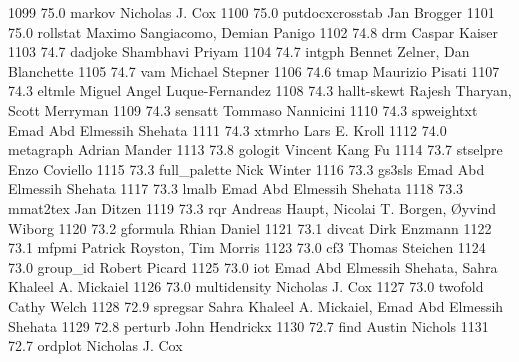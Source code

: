   1099     75.0    markov        Nicholas J. Cox                         
  1100     75.0    putdocxcrosstab  Jan Brogger                             
  1101     75.0    rollstat      Maximo Sangiacomo, Demian Panigo        
  1102     74.8    drm           Caspar Kaiser                           
  1103     74.7    dadjoke       Shambhavi Priyam                        
  1104     74.7    intgph        Bennet Zelner, Dan Blanchette           
  1105     74.7    vam           Michael Stepner                         
  1106     74.6    tmap          Maurizio Pisati                         
  1107     74.3    eltmle        Miguel Angel Luque-Fernandez            
  1108     74.3    hallt-skewt   Rajesh Tharyan, Scott Merryman          
  1109     74.3    sensatt       Tommaso Nannicini                       
  1110     74.3    spweightxt    Emad Abd Elmessih Shehata               
  1111     74.3    xtmrho        Lars E. Kroll                           
  1112     74.0    metagraph     Adrian Mander                           
  1113     73.8    gologit       Vincent Kang Fu                         
  1114     73.7    stselpre      Enzo Coviello                           
  1115     73.3    full_palette  Nick Winter                             
  1116     73.3    gs3sls        Emad Abd Elmessih Shehata               
  1117     73.3    lmalb         Emad Abd Elmessih Shehata               
  1118     73.3    mmat2tex      Jan Ditzen                              
  1119     73.3    rqr           Andreas Haupt, Nicolai T. Borgen,       
                                   Øyvind Wiborg                          
  1120     73.2    gformula      Rhian Daniel                            
  1121     73.1    divcat        Dirk Enzmann                            
  1122     73.1    mfpmi         Patrick Royston, Tim Morris             
  1123     73.0    cf3           Thomas Steichen                         
  1124     73.0    group_id      Robert Picard                           
  1125     73.0    iot           Emad Abd Elmessih Shehata, Sahra        
                                   Khaleel A. Mickaiel                     
  1126     73.0    multidensity  Nicholas J. Cox                         
  1127     73.0    twofold       Cathy Welch                             
  1128     72.9    spregsar      Sahra Khaleel A. Mickaiel, Emad Abd     
                                   Elmessih Shehata                        
  1129     72.8    perturb       John Hendrickx                          
  1130     72.7    find          Austin Nichols                          
  1131     72.7    ordplot       Nicholas J. Cox                         
